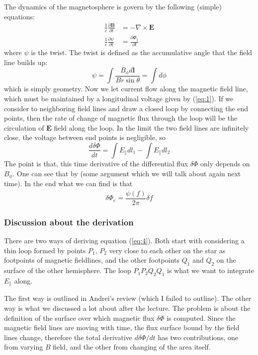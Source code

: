 \documentclass[letterpaper, 11pt]{article}
\numberwithin{equation}{section}
\numberwithin{figure}{section}
\begin{document}
The dynamics of the magnetosphere is govern by the following (simple) equations:
\begin{align}
  \frac{1}{c}\frac{\partial \boldsymbol{B}}{\partial t} &= -\nabla \times \boldsymbol{E} \\
  \frac{1}{c}\frac{\partial \psi}{\partial t} &= \frac{\partial \Phi_{\parallel}}{\partial t}
\end{align}
where $\psi$ is the twist. The twist is defined as the accumulative angle that the field line builds up:
\begin{equation}
    \label{eq:2}
    \psi = \int \frac{B_{\phi} d\boldsymbol{l}}{B r \sin\theta} = \int d\phi
\end{equation}
which is simply geometry. Now we let current flow along the magnetic field line, which must be maintained by a longitudinal voltage given by (\ref{eq:1}). If we consider to neighboring field lines and draw a closed loop by connecting the end points, then the rate of change of magnetic flux through the loop will be the circulation of $\boldsymbol{E}$ field along the loop. In the limit the two field lines are infinitely close, the voltage between end points is negligible, so
\begin{equation}
    \label{eq:3}
    \frac{d\delta\Phi}{dt} = \int E_{\parallel}dl_1 - \int E_{\parallel} dl_2
\end{equation}
The point is that, this time derivative of the differential flux $\delta\Phi$ only depends on $B_{\phi}$. One can see that by (some argument which we will talk about again next time). In the end what we can find is that
\begin{equation}
    \label{eq:4}
    \delta\Phi_{e} = \frac{\dot{\psi}(f)}{2\pi}\delta f
\end{equation}

\subsubsection{Discussion about the derivation}
\label{sec:disc-about-deriv}

There are two ways of deriving equation (\ref{eq:4}). Both start with considering a thin loop formed by points $P_1$, $P_2$ very close to each other on the star as footpoints of magnetic fieldlines, and the other footpoints $Q_1$ and $Q_2$ on the surface of the other hemisphere. The loop $\overline{P_1P_2Q_2Q_1}$ is what we want to integrate $E_{\parallel}$ along.

The first way is outlined in Andrei's review (which I failed to outline). The other way is what we discussed a lot about after the lecture. The problem is about the definition of the surface over which magnetic flux $\delta\Phi$ is computed. Since the magnetic field lines are moving with time, the flux surface bound by the field lines change, therefore the total derivative $d\delta\Phi/dt$ has two contributions, one from varying $B$ field, and the other from changing of the area itself.
\end{document}
